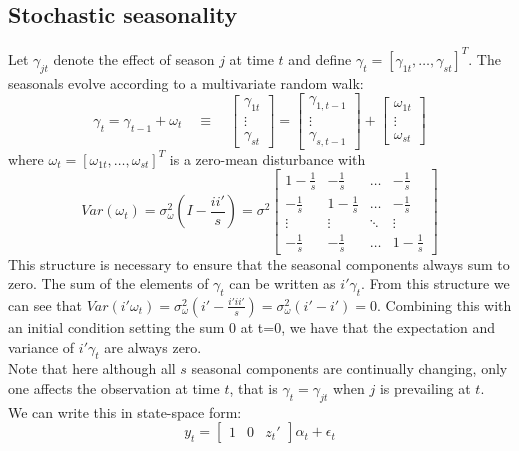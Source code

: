 \documentclass[DIV=14,titlepage=false]{scrreprt}
\begin{document}
\subsection{Stochastic seasonality}
Let $\gamma_{jt}$ denote the effect of season $j$ at time $t$ and define $\gamma_t = [\gamma_{1t} , \ldots , \gamma_{st}]^T$. The seasonals evolve according to a multivariate random walk:
\[
    \gamma_t = \gamma_{t-1} + \omega_t \quad \equiv \quad \begin{bmatrix}
    \gamma_{1t}\\
    \vdots\\
    \gamma_{st}
    \end{bmatrix} = \begin{bmatrix}
        \gamma_{1,t-1}\\
        \vdots\\
        \gamma_{s,t-1}
    \end{bmatrix} + \begin{bmatrix}
        \omega_{1t}\\
        \vdots\\
        \omega_{st}
    \end{bmatrix}
\]
where $\omega_t = [\omega_{1t} , \ldots , \omega_{st}]^T$ is a zero-mean disturbance with 
\[
    Var(\omega_t) = \sigma^2_\omega \left(I-\frac{ii'}{s}\right) = \sigma^2 \begin{bmatrix}
    1-\frac{1}{s} & -\frac{1}{s} & \ldots & -\frac{1}{s}\\
    -\frac{1}{s} & 1-\frac{1}{s} & \ldots & -\frac{1}{s}\\
    \vdots & \vdots & \ddots & \vdots\\
    -\frac{1}{s} & -\frac{1}{s} & \ldots & 1-\frac{1}{s}
    \end{bmatrix}
    \]
This structure is necessary to ensure that the seasonal components always sum to zero. The sum of the elements of $\gamma_t$ can be written as $i'\gamma_t$. From this structure we can see that $Var(i'\omega_t) = \sigma^2_\omega (i' - \frac{i'ii'}{s}) = \sigma^2_\omega (i'-i') = 0$. Combining this with an initial condition setting the sum 0 at t=0, we have that the expectation and variance of $i'\gamma_t$ are always zero.\\
Note that here although all $s$ seasonal components are continually changing, only one affects the observation at time $t$, that is $\gamma_t = \gamma_{jt}$ when $j$ is prevailing at $t$.\\
We can write this in state-space form:
\[
    y_t = \begin{bmatrix} 1 & 0 &  z_t ' \end{bmatrix} \alpha_t + \epsilon_t
\]
\end{document}
